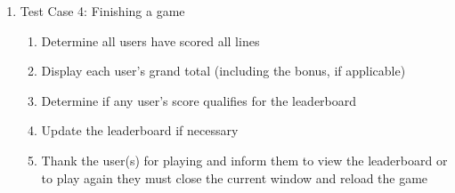 \documentclass[]{report}   %
\begin{document}
\begin{enumerate}
\begin{enumerate}
		\end{enumerate}
	\item Test Case 4: Finishing a game
		\begin{enumerate}
		\item Determine all users have scored all lines
		\item Display each user's grand total (including the bonus, if applicable)
		\item Determine if any user's score qualifies for the leaderboard 
		\item Update the leaderboard if necessary
		\item Thank the user(s) for playing and inform them to view the leaderboard or to play again they must close the current window and reload the game
		\end{enumerate}
	
\end{enumerate}

\vspace{2.2in}
\end{document}
